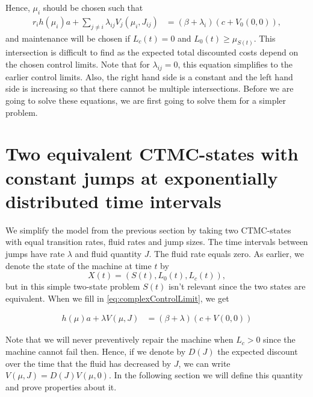Hence, $\mu_i$ should be chosen such that 
\begin{equation}\label{eq:complexControlLimit}
\begin{split}
r_i h(\mu_i)a+\sum\limits_{j\neq i}\lambda_{ij}V_j(\mu_i,J_{ij})&=(\beta+\lambda_i)(c+V_0(0,0)),
\end{split}
\end{equation}
and maintenance will be chosen if $L_c(t)=0$ and $L_0(t)\geq \mu_{S(t)}$.
This intersection is difficult to find as the expected total discounted costs depend on the chosen control limits.
Note that for $\lambda_{ij}=0$, this equation simplifies to the earlier control limits.
Also, the right hand side is a constant and the left hand side is increasing so that there cannot be multiple intersections.
Before we are going to solve these equations, we are first going to solve them for a simpler problem.

\section{Two equivalent CTMC-states with constant jumps at exponentially distributed time intervals}
We simplify the model from the previous section by taking two CTMC-states with equal transition rates, fluid rates and jump sizes.
The time intervals between jumps have rate $\lambda$ and fluid quantity $J$.
The fluid rate equals zero.
As earlier, we denote the state of the machine at time $t$ by
$$
X(t)=(S(t),L_0(t),L_c(t)),
$$
but in this simple two-state problem $S(t)$ isn't relevant since the two states are equivalent.
When we fill in \eqref{eq:complexControlLimit}, we get

\begin{equation}\label{eq:simpleJumpControlLimit}
\begin{split}
h(\mu)a+\lambda V(\mu,J)&=(\beta+\lambda)(c+V(0,0))
\end{split}
\end{equation}

Note that we will never preventively repair the machine when $L_c>0$ since the machine cannot fail then.
Hence, if we denote by $D(J)$ the expected discount over the time that the fluid has decreased by $J$, we can write $V(\mu,J)=D(J)V(\mu,0)$.
In the following section we will define this quantity and prove properties about it.


